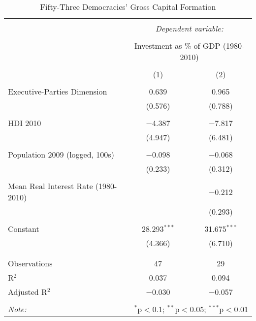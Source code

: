 \documentclass[11pt, oneside]{article}   	%
\begin{document}
\begin{table}[!Htbp] \centering
  \caption{Fifty-Three Democracies' Gross Capital Formation} 
  \label{} 
\small 
\begin{tabular}{@{\extracolsep{-20pt}}lcc} 
\\[-1.8ex]\hline 
\hline \\[-1.8ex] 
 & \multicolumn{2}{c}{\textit{Dependent variable:}} \\ 
\cline{2-3} 
\\[-1.8ex] & \multicolumn{2}{c}{Investment as \% of GDP (1980-2010)} \\ 
\\[-1.8ex] & (1) & (2)\\ 
\hline \\[-1.8ex] 
 Executive-Parties Dimension & 0.639 & 0.965 \\ 
  & (0.576) & (0.788) \\ 
  & & \\ 
 HDI 2010 & $-$4.387 & $-$7.817 \\ 
  & (4.947) & (6.481) \\ 
  & & \\ 
 Population 2009 (logged, 100s) & $-$0.098 & $-$0.068 \\ 
  & (0.233) & (0.312) \\ 
  & & \\ 
 Mean Real Interest Rate (1980-2010) &  & $-$0.212 \\ 
  &  & (0.293) \\ 
  & & \\ 
 Constant & 28.293$^{***}$ & 31.675$^{***}$ \\ 
  & (4.366) & (6.710) \\ 
  & & \\ 
\hline \\[-1.8ex] 
Observations & 47 & 29 \\ 
R$^{2}$ & 0.037 & 0.094 \\ 
Adjusted R$^{2}$ & $-$0.030 & $-$0.057 \\ 
\hline 
\hline \\[-1.8ex] 
\textit{Note:}  & \multicolumn{2}{r}{$^{*}$p$<$0.1; $^{**}$p$<$0.05; $^{***}$p$<$0.01} \\ 
\end{tabular} 
\end{table} 
\end{document}
